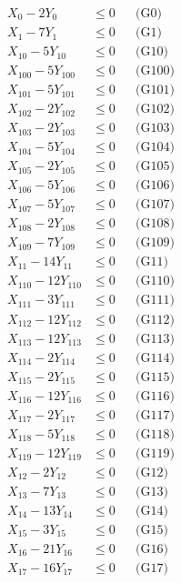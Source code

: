 \documentclass[a4paper,10pt]{article}
\begin{document}
\allowdisplaybreaks
{\small\begin{align}
X_{0} - 2Y_{0} &\leq 0 && \text{(G0)} \\
X_{1} - 7Y_{1} &\leq 0 && \text{(G1)} \\
X_{10} - 5Y_{10} &\leq 0 && \text{(G10)} \\
X_{100} - 5Y_{100} &\leq 0 && \text{(G100)} \\
X_{101} - 5Y_{101} &\leq 0 && \text{(G101)} \\
X_{102} - 2Y_{102} &\leq 0 && \text{(G102)} \\
X_{103} - 2Y_{103} &\leq 0 && \text{(G103)} \\
X_{104} - 5Y_{104} &\leq 0 && \text{(G104)} \\
X_{105} - 2Y_{105} &\leq 0 && \text{(G105)} \\
X_{106} - 5Y_{106} &\leq 0 && \text{(G106)} \\
X_{107} - 5Y_{107} &\leq 0 && \text{(G107)} \\
X_{108} - 2Y_{108} &\leq 0 && \text{(G108)} \\
X_{109} - 7Y_{109} &\leq 0 && \text{(G109)} \\
X_{11} - 14Y_{11} &\leq 0 && \text{(G11)} \\
X_{110} - 12Y_{110} &\leq 0 && \text{(G110)} \\
X_{111} - 3Y_{111} &\leq 0 && \text{(G111)} \\
X_{112} - 12Y_{112} &\leq 0 && \text{(G112)} \\
X_{113} - 12Y_{113} &\leq 0 && \text{(G113)} \\
X_{114} - 2Y_{114} &\leq 0 && \text{(G114)} \\
X_{115} - 2Y_{115} &\leq 0 && \text{(G115)} \\
\allowbreak
X_{116} - 12Y_{116} &\leq 0 && \text{(G116)} \\
X_{117} - 2Y_{117} &\leq 0 && \text{(G117)} \\
X_{118} - 5Y_{118} &\leq 0 && \text{(G118)} \\
X_{119} - 12Y_{119} &\leq 0 && \text{(G119)} \\
X_{12} - 2Y_{12} &\leq 0 && \text{(G12)} \\
X_{13} - 7Y_{13} &\leq 0 && \text{(G13)} \\
X_{14} - 13Y_{14} &\leq 0 && \text{(G14)} \\
X_{15} - 3Y_{15} &\leq 0 && \text{(G15)} \\
X_{16} - 21Y_{16} &\leq 0 && \text{(G16)} \\
X_{17} - 16Y_{17} &\leq 0 && \text{(G17)} \\

\end{align}}
\end{document}

